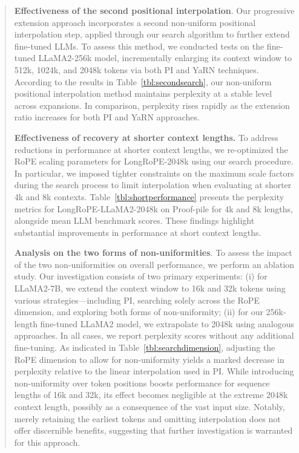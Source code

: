 \begin{abstract}
\textbf{Effectiveness of the second positional interpolation}. Our progressive extension approach incorporates a second non-uniform positional interpolation step, applied through our search algorithm to further extend fine-tuned LLMs. To assess this method, we conducted tests on the fine-tuned LLaMA2-256k model, incrementally enlarging its context window to 512k, 1024k, and 2048k tokens via both PI and YaRN techniques. According to the results in Table~\ref{tbl:secondsearch}, our non-uniform positional interpolation method maintains perplexity at a stable level across expansions. In comparison, perplexity rises rapidly as the extension ratio increases for both PI and YaRN approaches.

\textbf{Effectiveness of recovery at shorter context lengths.} To address reductions in performance at shorter context lengths, we re-optimized the RoPE scaling parameters for LongRoPE-2048k using our search procedure. In particular, we imposed tighter constraints on the maximum scale factors during the search process to limit interpolation when evaluating at shorter 4k and 8k contexts. Table~\ref{tbl:shortperformance} presents the perplexity metrics for LongRoPE-LLaMA2-2048k on Proof-pile for 4k and 8k lengths, alongside mean LLM benchmark scores. These findings highlight substantial improvements in performance at short context lengths.

\textbf{Analysis on the two forms of non-uniformities}. To assess the impact of the two non-uniformities on overall performance, we perform an ablation study. Our investigation consists of two primary experiments: (i) for LLaMA2-7B, we extend the context window to 16k and 32k tokens using various strategies—including PI, searching solely across the RoPE dimension, and exploring both forms of non-uniformity; (ii) for our 256k-length fine-tuned LLaMA2 model, we extrapolate to 2048k using analogous approaches. In all cases, we report perplexity scores without any additional fine-tuning. As indicated in Table~\ref{tbl:searchdimension}, adjusting the RoPE dimension to allow for non-uniformity yields a marked decrease in perplexity relative to the linear interpolation used in PI. While introducing non-uniformity over token positions boosts performance for sequence lengths of 16k and 32k, its effect becomes negligible at the extreme 2048k context length, possibly as a consequence of the vast input size. Notably, merely retaining the earliest tokens and omitting interpolation does not offer discernible benefits, suggesting that further investigation is warranted for this approach.


\end{abstract}
